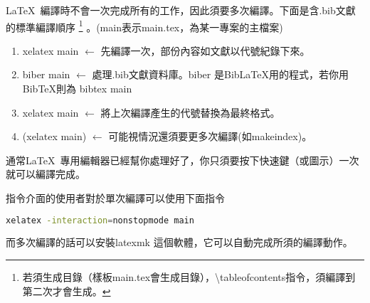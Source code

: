 \documentclass[class=NCU_thesis, crop=false, float=true]{standalone}
\begin{document}
\LaTeX\ 編譯時不會一次完成所有的工作，因此須要多次編譯。下面是含.bib文獻的標準編譯順序
\footnote{若須生成目錄（樣板main.tex會生成目錄），\textbackslash{}tableofcontents指令，須編譯到第二次才會生成。}
。(main表示main.tex，為某一專案的主檔案)
\begin{enumerate}
	\item xelatex main   $\longleftarrow$ 先編譯一次，部份內容如文獻以代號紀錄下來。
	\item biber main     $\longleftarrow$ 處理.bib文獻資料庫。biber 是BibLaTeX用的程式，若你用BibTeX則為 bibtex main
	\item xelatex main   $\longleftarrow$ 將上次編譯產生的代號替換為最終格式。
	\item (xelatex main) $\longleftarrow$ 可能視情況還須要更多次編譯(如makeindex)。
\end{enumerate}
通常\LaTeX\ 專用編輯器已經幫你處理好了，你只須要按下快速鍵（或圖示）一次就可以編譯完成。

指令介面的使用者對於單次編譯可以使用下面指令
\begin{lstlisting}[style=consoleStyle,language=bash]
xelatex -interaction=nonstopmode main
\end{lstlisting}

而多次編譯的話可以安裝latexmk 這個軟體，它可以自動完成所須的編譯動作。
\end{document}
